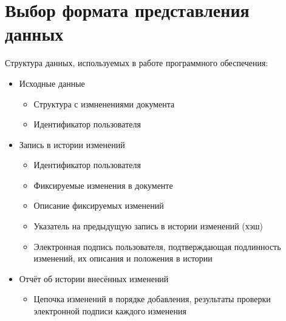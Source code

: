\section{Выбор формата представления данных} \label{technologic_data}

Структура данных, используемых в работе программного обеспечения:
\begin{itemize}
	\item Исходные данные
	\begin{itemize}
		\item Структура с измненениями документа
		\item Идентификатор пользователя
	\end{itemize}
	\item Запись в истории изменений
	\begin{itemize}
		\item Идентификатор пользователя
		\item Фиксируемые изменения в документе
		\item Описание фиксируемых изменений
		\item Указатель на предыдущую запись в истории изменений (хэш)
		\item Электронная подпись пользователя, подтверждающая подлинность изменений, их описания и положения в истории
	\end{itemize}
	\item Отчёт об истории внесённых изменений
	\begin{itemize}
		\item Цепочка изменений в порядке добавления, результаты проверки электронной подписи каждого изменения
	\end{itemize}
\end{itemize}